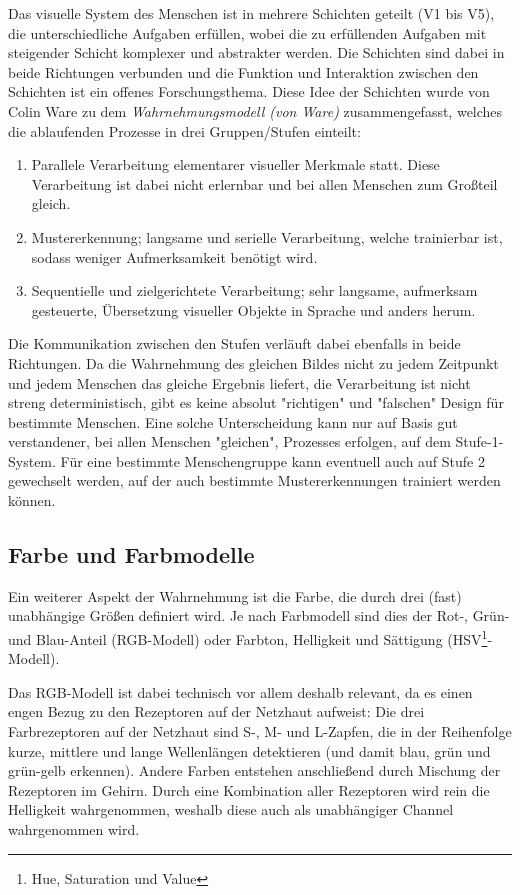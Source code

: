 		Das visuelle System des Menschen ist in mehrere Schichten geteilt (V1 bis V5), die unterschiedliche Aufgaben erfüllen, wobei die zu erfüllenden Aufgaben mit steigender Schicht komplexer und abstrakter werden. Die Schichten sind dabei in beide Richtungen verbunden und die Funktion und Interaktion zwischen den Schichten ist ein offenes Forschungsthema. Diese Idee der Schichten wurde von Colin Ware zu dem \emph{Wahrnehmungsmodell (von Ware)} zusammengefasst, welches die ablaufenden Prozesse in drei Gruppen/Stufen einteilt:
		\begin{enumerate}
			\item Parallele Verarbeitung elementarer visueller Merkmale statt. Diese Verarbeitung ist dabei nicht erlernbar und bei allen Menschen zum Großteil gleich.
			\item Mustererkennung; langsame und serielle Verarbeitung, welche trainierbar ist, sodass weniger Aufmerksamkeit benötigt wird.
			\item Sequentielle und zielgerichtete Verarbeitung; sehr langsame, aufmerksam gesteuerte, Übersetzung visueller Objekte in Sprache und anders herum.
		\end{enumerate}
		Die Kommunikation zwischen den Stufen verläuft dabei ebenfalls in beide Richtungen. Da die Wahrnehmung des gleichen Bildes nicht zu jedem Zeitpunkt und jedem Menschen das gleiche Ergebnis liefert, \dh die Verarbeitung ist nicht streng deterministisch, gibt es keine absolut "richtigen" und "falschen" Design für bestimmte Menschen. Eine solche Unterscheidung kann nur auf Basis gut verstandener, bei allen Menschen "gleichen", Prozesses erfolgen, \dh auf dem Stufe-1-System. Für eine bestimmte Menschengruppe kann eventuell auch auf Stufe 2 gewechselt werden, auf der auch bestimmte Mustererkennungen trainiert werden können.

		\subsection{Farbe und Farbmodelle}
			\label{subsec:farbe}

			Ein weiterer Aspekt der Wahrnehmung ist die Farbe, die durch drei (fast) unabhängige Größen definiert wird. Je nach Farbmodell sind dies \bspw der Rot-, Grün- und Blau-Anteil (RGB-Modell) oder Farbton, Helligkeit und Sättigung (HSV\footnote{Hue, Saturation und Value}-Modell).

			Das RGB-Modell ist dabei technisch vor allem deshalb relevant, da es einen engen Bezug zu den Rezeptoren auf der Netzhaut aufweist: Die drei Farbrezeptoren auf der Netzhaut sind S-, M- und L-Zapfen, die in der Reihenfolge kurze, mittlere und lange Wellenlängen detektieren (und damit blau, grün und grün-gelb erkennen). Andere Farben entstehen anschließend durch Mischung der Rezeptoren im Gehirn. Durch eine Kombination aller Rezeptoren wird rein die Helligkeit wahrgenommen, weshalb diese auch als unabhängiger Channel wahrgenommen wird.

